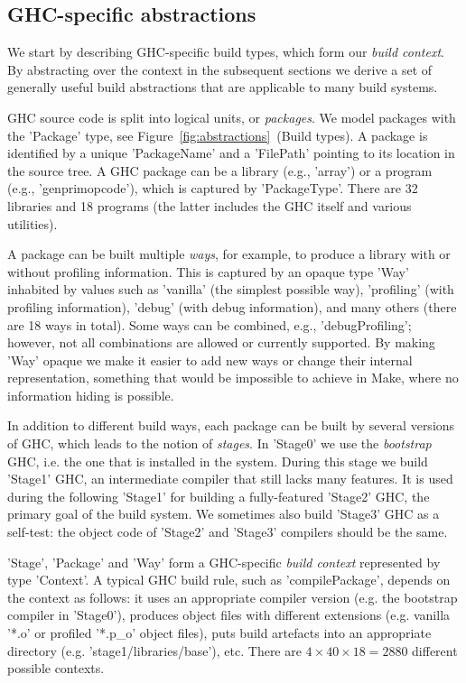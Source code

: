 \subsection{GHC-specific abstractions\label{sec:ghc-context}}

We start by describing GHC-specific build types, which form our \emph{build
context}. By abstracting over the context in the subsequent sections we derive a
set of generally useful build abstractions that are applicable to many build
systems.

GHC source code is split into logical units, or \emph{packages}. We model
packages with the \lst'Package' type, see
Figure~\ref{fig:abstractions}~(Build types). A package is identified by a
unique \lst'PackageName' and a \lst'FilePath' pointing to its location in the
source tree. A GHC package can be a library (e.g., \lst'array') or a program
(e.g., \lst'genprimopcode'), which is captured by \lst'PackageType'. There are
32 libraries and 18 programs (the latter includes the GHC itself and various utilities).

A package can be built multiple \emph{ways}, for example, to produce a library
with or without profiling information. This is captured by an opaque
type \lst'Way' inhabited by values such as \lst'vanilla' (the simplest
possible way), \lst'profiling' (with profiling information), \lst'debug'
(with debug information), and many others (there are 18 ways in total). Some
ways can be combined, e.g., \lst'debugProfiling'; however, not all combinations
are allowed or currently supported. By making \lst'Way' opaque we make it easier
to add new ways or change their internal representation, something that would be
impossible to achieve in Make, where no information hiding is possible.

In addition to different build ways, each package can be built by several
versions of GHC, which leads to the notion of \emph{stages}.
In \lst'Stage0' we use the \emph{bootstrap} GHC, i.e. the one that is
installed in the system. During this stage we build \lst'Stage1' GHC, an
intermediate compiler that still lacks many features. It is used during the
following \lst'Stage1' for building a fully-featured \lst'Stage2' GHC, the
primary goal of the build system. We sometimes also build \lst'Stage3' GHC as
a self-test: the object code of \lst'Stage2' and \lst'Stage3' compilers
should be the same.

\lst'Stage', \lst'Package' and \lst'Way' form a GHC-specific
\emph{build context} represented by type \lst'Context'. A typical GHC build
rule, such as \lst'compilePackage', depends on the context as follows: it
uses an appropriate compiler version (e.g. the bootstrap compiler in
\lst'Stage0'), produces object files with different extensions (e.g. vanilla
\lst'*.o' or profiled \lst'*.p_o' object files), puts build artefacts
into an appropriate directory (e.g. \lst'stage1/libraries/base'), etc.
There are $4 \times 40 \times 18 = 2880$ different possible contexts.

